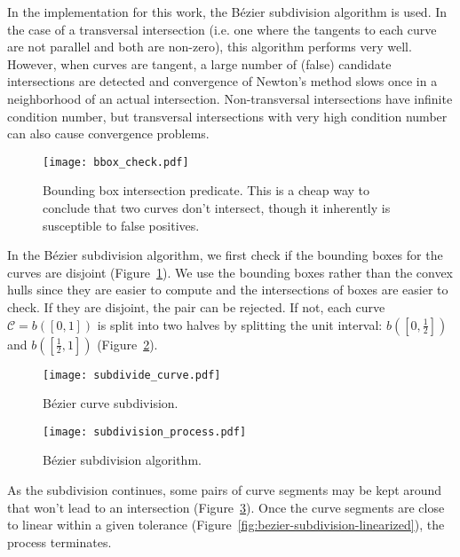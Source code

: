 \documentclass[letterpaper,10pt]{article}
\theoremstyle{definition}
\begin{document}
In the implementation for this work, the B\'{e}zier subdivision
algorithm is used.
In the case of a transversal intersection (i.e. one where the
tangents to each curve are not parallel and both are non-zero),
this algorithm performs very well. However, when curves are tangent,
a large number of (false) candidate intersections are detected and
convergence of Newton's method slows once in a neighborhood of an
actual intersection. Non-transversal intersections
have infinite condition number, but transversal intersections with
very high condition number can also cause convergence problems.

\begin{figure}
  \texttt{[image: bbox\_check.pdf]}
  \centering
  \captionsetup{width=.75\linewidth}
  \caption{Bounding box intersection predicate. This is a cheap way to
    conclude that two curves don't intersect, though it inherently is
    susceptible to false positives.}
  \label{fig:bounding-box-check}
\end{figure}

In the B\'{e}zier subdivision algorithm, we first check if the
bounding boxes for the curves are disjoint
(Figure~\ref{fig:bounding-box-check}).
We use the bounding boxes
rather than the convex hulls since they are easier to compute and
the intersections of boxes are easier to check.
If they are disjoint, the pair can be rejected. If not, each curve
\(\mathcal{C} = b\left(\left[0, 1\right]\right)\) is split into two halves
by splitting the unit interval: \(b\left(\left[0, \frac{1}{2}\right]\right)\)
and \(b\left(\left[\frac{1}{2}, 1\right]\right)\)
(Figure~\ref{fig:bezier-curve-subdivision}).

\begin{figure}
  \texttt{[image: subdivide\_curve.pdf]}
  \centering
  \captionsetup{width=.75\linewidth}
  \caption{B\'{e}zier curve subdivision.}
  \label{fig:bezier-curve-subdivision}
\end{figure}

\begin{figure}
  \texttt{[image: subdivision\_process.pdf]}
  \centering
  \captionsetup{width=.75\linewidth}
  \caption{B\'{e}zier subdivision algorithm.}
  \label{fig:bezier-subdivision-process}
\end{figure}

As the subdivision continues,
some pairs of curve segments may be kept around that won't lead to an
intersection (Figure~\ref{fig:bezier-subdivision-process}).
Once the curve segments are close to linear within a given tolerance
(Figure~\ref{fig:bezier-subdivision-linearized}), the process
terminates.
\end{document}
